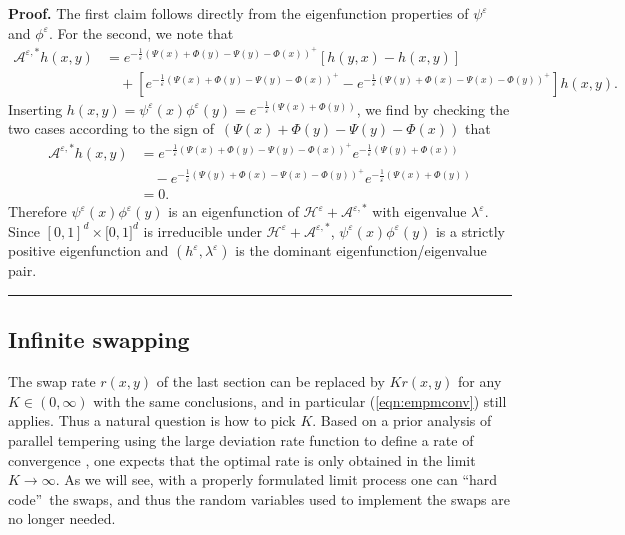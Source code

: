 \documentclass[english,11pt]{article}%
\numberwithin{equation}{section}
\numberwithin{example}{section}
\numberwithin{theorem}{section}
\newenvironment{proof}[1][Proof]{\noindent\textbf{#1.} }{\ \rule{0.5em}{0.5em}}
\begin{document}
\begin{proof}
The first claim follows directly from the eigenfunction properties of
$\psi^{\varepsilon}$ and $\phi^{\varepsilon}$. For the second, we note that
\begin{align*}
\mathcal{A}^{\varepsilon,\ast}h(x,y)  &  =e^{-\frac{1}{\varepsilon}\left(
\Psi(x)+\Phi(y)-\Psi(y)-\Phi(x)\right)  ^{+}}\left[  h(y,x)-h(x,y)\right] \\
&  \quad+\left[ e^{-\frac{1}{\varepsilon}\left(  \Psi(x)+\Phi
(y)-\Psi(y)-\Phi(x)\right)^{+}} -e^{-\frac{1}{\varepsilon}\left(  \Psi(y)+\Phi(x)-\Psi
(x)-\Phi(y)\right)  ^{+}}\right]  h(x,y).
\end{align*} 
Inserting $h(x,y)=\psi^{\varepsilon}(x)\phi^{\varepsilon}(y)=e^{-\frac
{1}{\varepsilon}\left(  \Psi(x)+\Phi(y)\right)  }$, we find by checking the
two cases according to the sign of~$\left(  \Psi(x)+\Phi(y)-\Psi
(y)-\Phi(x)\right)  $ that
\begin{align*}
\mathcal{A}^{\varepsilon,\ast}h(x,y)  &  =e^{-\frac{1}{\varepsilon}\left(
\Psi(x)+\Phi(y)-\Psi(y)-\Phi(x)\right)  ^{+}}e^{-\frac{1}{\varepsilon}\left(
\Psi(y)+\Phi(x)\right)  }\\
&  \quad-e^{-\frac{1}{\varepsilon}\left(  \Psi(y)+\Phi(x)-\Psi(x)-\Phi
(y)\right)  ^{+}}e^{-\frac{1}{\varepsilon}\left(  \Psi(x)+\Phi(y)\right)  }\\
&  =0.
\end{align*}
Therefore $\psi^{\varepsilon}(x)\phi^{\varepsilon}(y)$ is an eigenfunction of
$\mathcal{H}^{\varepsilon}+\mathcal{A}^{\varepsilon,\ast}$ with eigenvalue
$\lambda^{\varepsilon}$. Since $[0,1]^{d}\times\lbrack0,1]^{d}$ is irreducible
under $\mathcal{H}^{\varepsilon}+\mathcal{A}^{\varepsilon,\ast}$,
$\psi^{\varepsilon}(x)\phi^{\varepsilon}(y)$ is a strictly positive
eigenfunction and $(h^{\varepsilon},\lambda^{\varepsilon})$ is the dominant
eigenfunction/eigenvalue pair.
\end{proof}

\subsection{Infinite swapping}

\label{sec:infswap} The swap rate $r(x,y)$ of the last section can be replaced
by $Kr(x,y)$ for any $K\in(0,\infty)$ with the same conclusions, and in
particular (\ref{eqn:empmconv}) still applies. Thus a natural question is how
to pick $K$. Based on a prior analysis of parallel tempering using the large
deviation rate function to define a rate of convergence \cite{dupliupladol},
one expects that the optimal rate is only obtained in the limit $K\rightarrow
\infty$. As we will see, with a properly formulated limit process one can
\textquotedblleft hard code\textquotedblright\ the swaps, and thus the random
variables used to implement the swaps are no longer needed.
\end{document}
